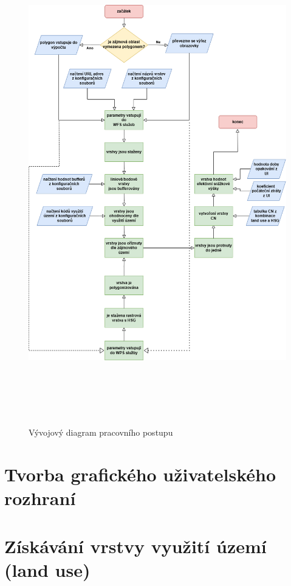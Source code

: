 \documentclass[a4paper,oneside,12pt]{book}
\begin{document}
\begin{figure}[ht] \label{obr11}
\centering
\includegraphics[height=21cm]{pictures/diagram.png}
\caption{Vývojový diagram pracovního postupu}
\label{fig:diagram}
\end{figure}

\section{Tvorba grafického uživatelského rozhraní} \label{gui}
\section{Získávání vrstvy využití území (land use)} \label{landuse}
\end{document}
